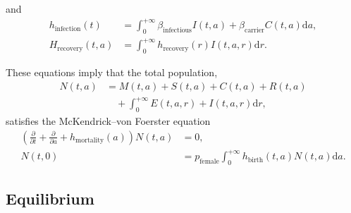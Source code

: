 \documentclass[12pt]{article}
\newcommand{\md}{\mathrm{d}}
\begin{document}
and
\begin{equation}
  \begin{split}
    h_{\text{infection}}(t)
    &= \int_0^{+\infty} \beta_{\text{infectious}} I(t, a)
    + \beta_{\text{carrier}} C(t, a) \md a,
    \\
    H_{\text{recovery}}(t, a)
    &= \int_0^{+\infty}h_{\text{recovery}}(r) I(t, a, r) \md r.
  \end{split}
\end{equation}

These equations imply that the total population,
\begin{equation}
  \begin{split}
    N(t, a) &= M(t, a) + S(t, a) + C(t, a) + R(t, a)
    \\ & \quad {}
    + \int_0^{+\infty} E(t, a, r) + I(t, a, r) \md r,
  \end{split}
\end{equation}
satisfies the McKendrick--von Foerster equation
\begin{equation}
  \begin{split}
    \left(
      \frac{\partial}{\partial t}
      + \frac{\partial}{\partial a}
      + h_{\text{mortality}}(a)
    \right)
    N(t, a)
    &= 0,
    \\
    N(t, 0)
    &= p_{\text{female}}
    \int_0^{+\infty} h_{\text{birth}}(t, a) N(t, a) \md a.
  \end{split}
\end{equation}


\subsection{Equilibrium}
\end{document}
